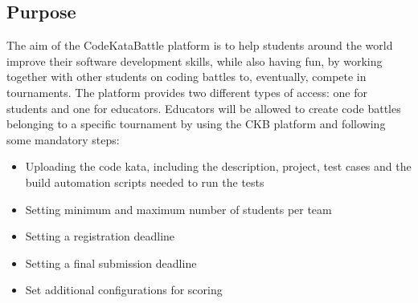 \documentclass[12pt,oneside,a4paper]{article}
\begin{document}
\subsection{Purpose}
The aim of the CodeKataBattle platform is to help students around the world improve their software development skills, while also having fun, by working together with other students on coding battles to, eventually, compete in tournaments. The platform provides two different types of access: one for students and one for educators. 
Educators will be allowed to create code battles belonging to a specific tournament by using the CKB platform and following some mandatory steps:
\begin{itemize}
    \item Uploading the code kata, including the description, project, test cases and the build automation scripts needed to run the tests
    \item Setting minimum and maximum number of students per team
    \item Setting a registration deadline
    \item Setting a final submission deadline
    \item Set additional configurations for scoring
\end{itemize}
\end{document}
